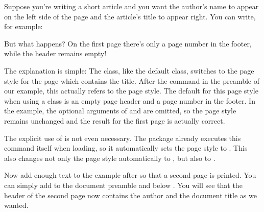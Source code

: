 %
\begin{Example}
  Suppose you're writing a short article and you want the author's name to
  appear on the left side of the page and the article's title to appear
  right. You can write, for example:
  But what happens? On the first page there's only a page number in the
  footer, while the header remains empty!

  The explanation is simple: The  class, like the default
   class, switches to the  page style for the
  page which contains the title. After the command
   in the preamble of
  our example, this actually refers to the
   page style. The default for
  this page style when using a \KOMAScript{} class is an empty page header and
  a page number in the footer. In the example, the optional arguments of
   and  are omitted, so the
   page style remains
  unchanged and the result for the first page is actually correct.

  The explicit use of 
  is not even necessary. The package already executes this command itself when
  loading, so it automatically sets the page style to
  . This
  also changes not only the page style
   automatically
  to , but also
   to
  .
  
  Now add enough text to the example after  
  so that a second page is printed. You can simply add
   to the document
  preamble and  below
  . You will see that the header of the second
  page now contains the author and the document title as we wanted.


\end{Example}
